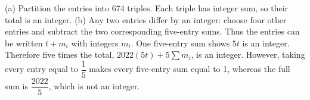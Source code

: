 (a) Partition the entries into 674 triples. Each triple has integer sum, so their total is an integer. (b) Any two entries differ by an integer: choose four other entries and subtract the two corresponding five-entry sums. Thus the entries can be written $t+m_i$ with integers $m_i$. One five-entry sum shows $5t$ is an integer. Therefore five times the total, $2022(5t)+5\sum m_i$, is an integer. However, taking every entry equal to $\dfrac{1}{5}$ makes every five-entry sum equal to 1, whereas the full sum is $\dfrac{2022}{5}$, which is not an integer.
